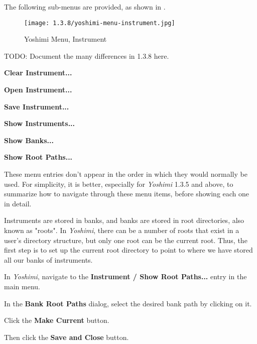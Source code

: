    The following sub-menus are provided, as shown in
   .

\begin{figure}[H]
   \centering 
   \texttt{[image: 1.3.8/yoshimi-menu-instrument.jpg]}
   \caption{Yoshimi Menu, Instrument}
   \label{fig:yoshimi_instrument_menu}
\end{figure}

   TODO:  Document the many differences in 1.3.8 here.

   \begin{enumber}
      \item \textbf{Clear Instrument...}
      \item \textbf{Open Instrument...}
      \item \textbf{Save Instrument...}
      \item \textbf{Show Instruments...}
      \item \textbf{Show Banks...}
      \item \textbf{Show Root Paths...}
   \end{enumber}

   These menu entries don't appear in the order in which they would normally
   be used.  For simplicity, it is better, especially for \textsl{Yoshimi}
   1.3.5 and above, to summarize how to navigate through these menu items,
   before showing each one in detail.

   \setcounter{ItemCounter}{0}      %

   Instruments are stored in banks, and banks are stored in root directories,
   also known as "roots".  In \textsl{Yoshimi}, there can be a number of
   roots that exist in a user's directory structure, but only one root can be
   the current root.  Thus, the first step is to set up the current root
   directory to point to where we have stored all our banks of instruments.

   \begin{enumber}
      \item In \textsl{Yoshimi}, navigate to the \textbf{Instrument / Show
      Root Paths...} entry in the main menu.
      \item In the \textbf{Bank Root Paths} dialog, select the desired
      bank path by clicking on it.
      \item Click the \textbf{Make Current} button.
      \item Then click the \textbf{Save and Close} button.
   \end{enumber}


